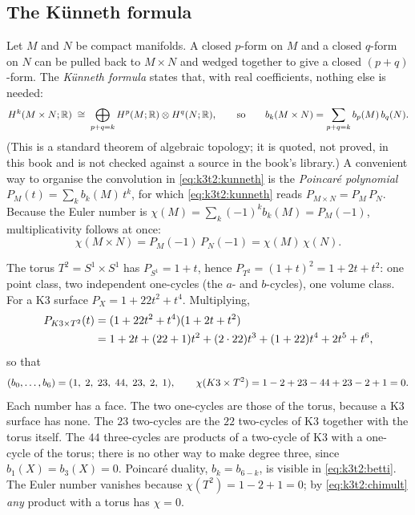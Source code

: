 \subsection{The K\"unneth formula}
Let $M$ and $N$ be compact manifolds. A closed $p$-form on $M$ and a closed $q$-form on $N$
can be pulled back to $M\times N$ and wedged together to give a closed $(p+q)$-form. The
\emph{K\"unneth formula} states that, with real coefficients, nothing
else is needed:
\begin{equation}\label{eq:k3t2:kunneth}
 H^k(M\times N;\mathbb{R})\;\cong\;\bigoplus_{p+q=k}H^p(M;\mathbb{R})\otimes H^q(N;\mathbb{R}),
 \qquad\text{so}\qquad b_k(M\times N)=\sum_{p+q=k}b_p(M)\,b_q(N).
\end{equation}
(This is a standard theorem of algebraic topology; it is quoted, not proved, in this book and
is not checked against a source in the book's library.) A convenient way to organise the
convolution in \eqref{eq:k3t2:kunneth} is the \emph{Poincar\'e polynomial}%
 $P_M(t)=\sum_k b_k(M)\,t^k$, for which
\eqref{eq:k3t2:kunneth} reads $P_{M\times N}=P_M\,P_N$. Because the Euler number%
 is $\chi(M)=\sum_k(-1)^kb_k(M)=P_M(-1)$, multiplicativity follows
at once:
\begin{equation}\label{eq:k3t2:chimult}
 \chi(M\times N)=P_M(-1)\,P_N(-1)=\chi(M)\,\chi(N).
\end{equation}

\begin{example}\label{ex:k3t2:betti}
The torus $T^2=S^1\times S^1$ has $P_{S^1}=1+t$, hence $P_{T^2}=(1+t)^2=1+2t+t^2$: one
point class, two independent one-cycles (the $a$- and $b$-cycles), one volume class. For a K3
surface $P_X=1+22t^2+t^4$. Multiplying,
\begin{align}
 P_{K3\times T^2}(t)&=(1+22t^2+t^4)(1+2t+t^2)\notag\\
 &=1+2t+(22+1)t^2+(2\cdot 22)t^3+(1+22)t^4+2t^5+t^6 ,\label{eq:k3t2:poincare}
\end{align}
so that
\begin{equation}\label{eq:k3t2:betti}
 (b_0,\dots,b_6)=(1,\;2,\;23,\;44,\;23,\;2,\;1),\qquad
 \chi(K3\times T^2)=1-2+23-44+23-2+1=0 .
\end{equation}
Each number has a face. The two one-cycles are those of the torus, because a K3 surface has
none. The $23$ two-cycles are the $22$ two-cycles of K3 together with the torus itself. The
$44$ three-cycles are products of a two-cycle of K3 with a one-cycle of the torus; there is no
other way to make degree three, since $b_1(X)=b_3(X)=0$. Poincar\'e duality,
$b_k=b_{6-k}$, is visible in \eqref{eq:k3t2:betti}. The Euler number vanishes because
$\chi(T^2)=1-2+1=0$; by \eqref{eq:k3t2:chimult} \emph{any} product with a torus has
$\chi=0$.
\end{example}

